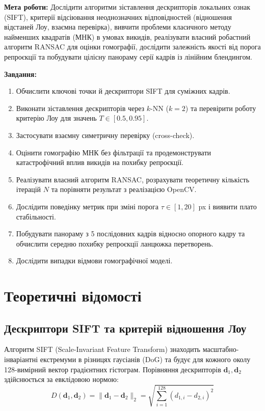 \documentclass[12pt, a4paper]{article}
\begin{document}
	\textbf{Мета роботи:} Дослідити алгоритми зіставлення дескрипторів локальних ознак (SIFT), критерії відсіювання неоднозначних відповідностей (відношення відстаней Лоу, взаємна перевірка), вивчити проблеми класичного методу найменших квадратів (МНК) в умовах викидів, реалізувати власний робастний алгоритм RANSAC для оцінки гомографії, дослідити залежність якості від порога репроєкції та побудувати цілісну панораму серії кадрів із лінійним блендингом.
	
	\textbf{Завдання:}
	\begin{enumerate}
		\item Обчислити ключові точки й дескриптори SIFT для суміжних кадрів.
		\item Виконати зіставлення дескрипторів через $k$-NN ($k=2$) та перевірити роботу критерію Лоу для значень $T \in [0.5, 0.95]$.
		\item Застосувати взаємну симетричну перевірку (cross-check).
		\item Оцінити гомографію МНК без фільтрації та продемонструвати катастрофічний вплив викидів на похибку репроєкції.
		\item Реалізувати власний алгоритм RANSAC, розрахувати теоретичну кількість ітерацій $N$ та порівняти результат з реалізацією OpenCV.
		\item Дослідити поведінку метрик при зміні порога $\tau \in [1, 20]$ px і виявити плато стабільності.
		\item Побудувати панораму з 5 послідовних кадрів відносно опорного кадру та обчислити середню похибку репроєкції ланцюжка перетворень.
		\item Дослідити випадки відмови гомографічної моделі.
	\end{enumerate}
	
	\section{Теоретичні відомості}
	
	\subsection{Дескриптори SIFT та критерій відношення Лоу}
	Алгоритм SIFT (Scale-Invariant Feature Transform) знаходить масштабно-інваріантні екстремуми в різницях гаусіанів (DoG) та будує для кожного околу 128-вимірний вектор градієнтних гістограм. Порівняння дескрипторів $\mathbf{d}_1, \mathbf{d}_2$ здійснюється за евклідовою нормою:
	\begin{equation}
		D(\mathbf{d}_1, \mathbf{d}_2) = \|\mathbf{d}_1 - \mathbf{d}_2\|_2 = \sqrt{\sum_{i=1}^{128} (d_{1,i} - d_{2,i})^2}
	\end{equation}
	
\end{document}
